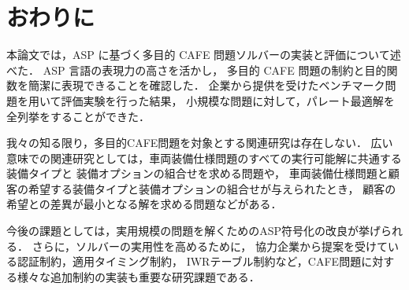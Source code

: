 \section{おわりに}

本論文では，ASP に基づく多目的 CAFE 問題ソルバーの実装と評価について述べた．
ASP 言語の表現力の高さを活かし，
多目的 CAFE 問題の制約と目的関数を簡潔に表現できることを確認した．
企業から提供を受けたベンチマーク問題を用いて評価実験を行った結果，
小規模な問題に対して，パレート最適解を全列挙をすることができた．

我々の知る限り，多目的CAFE問題を対象とする関連研究は存在しない．
広い意味での関連研究としては，車両装備仕様問題のすべての実行可能解に共通する装備タイプと
装備オプションの組合せを求める問題\cite{genay19:jim}や，
車両装備仕様問題と顧客の希望する装備タイプと装備オプションの組合せが与えられたとき，
顧客の希望との差異が最小となる解を求める問題\cite{walter13:ceur}などがある．

今後の課題としては，実用規模の問題を解くためのASP符号化の改良が挙げられる．
さらに，ソルバーの実用性を高めるために，
協力企業から提案を受けている認証制約，適用タイミング制約，
IWRテーブル制約など，CAFE問題に対する様々な追加制約の実装も重要な研究課題である．


